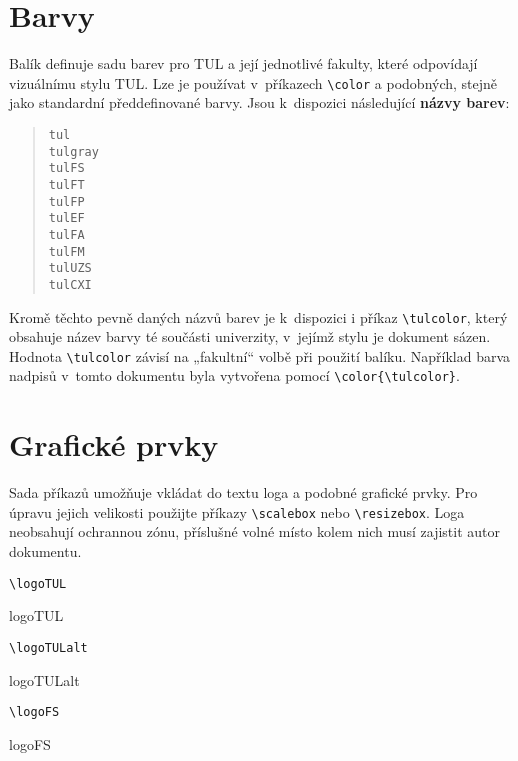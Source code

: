\documentclass[a4paper,12pt,twoside]{article}
\newcommand{\cmdfont}[1]{\texttt{\color{\tulcolor}#1}}
\newcommand{\cmd}[1]{\cmdfont{\textbackslash #1}}
\newcommand{\demobox}{\raisebox{-.5ex}{\rule{1em}{1em}}}
\begin{document}
\section{Barvy}

Balík definuje sadu barev pro TUL a její jednotlivé fakulty, které odpovídají
vizuálnímu stylu TUL. Lze je používat v~příkazech \cmd{color} a podobných,
stejně jako standardní předdefinované barvy. Jsou k~dispozici následující
\textbf{názvy barev}:

\begin{quote}
{\color{tul}\demobox}\quad\cmdfont{tul}\\
{\color{tulgray}\demobox}\quad\cmdfont{tulgray}\\
{\color{tulFS}\demobox}\quad\cmdfont{tulFS}\\
{\color{tulFT}\demobox}\quad\cmdfont{tulFT}\\
{\color{tulFP}\demobox}\quad\cmdfont{tulFP}\\
{\color{tulEF}\demobox}\quad\cmdfont{tulEF}\\
{\color{tulFA}\demobox}\quad\cmdfont{tulFA}\\
{\color{tulFM}\demobox}\quad\cmdfont{tulFM}\\
{\color{tulUZS}\demobox}\quad\cmdfont{tulUZS}\\
{\color{tulCXI}\demobox}\quad\cmdfont{tulCXI}
\end{quote}

Kromě těchto pevně daných názvů barev je k~dispozici i příkaz \cmd{tulcolor},
který obsahuje název barvy té součásti univerzity, v~jejímž stylu je dokument
sázen. Hodnota \cmd{tulcolor} závisí na „fakultní“ volbě při použití
balíku. Například barva nadpisů v~tomto dokumentu byla vytvořena pomocí
\cmd{color\{\textbackslash tulcolor\}}.


\section{Grafické prvky}

Sada příkazů umožňuje vkládat do textu loga a podobné grafické prvky. Pro
úpravu jejich velikosti použijte příkazy \cmd{scalebox} nebo \cmd{resizebox}.
Loga neobsahují ochrannou zónu, příslušné volné místo kolem nich musí zajistit
autor dokumentu.

\newcommand{\cmddemo}[1]{\bigskip\parbox[c]{3.5cm}{\cmd{#1}}\parbox[c]{10cm}{\csname #1\endcsname}\bigskip}
\cmddemo{logoTUL}

\cmddemo{logoTULalt}

\cmddemo{logoFS}
\end{document}
